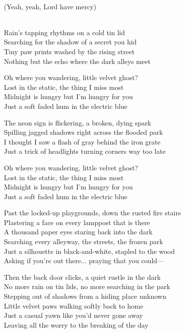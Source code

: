\begin{lyrics}
\\
(Yeah, yeah, Lord have mercy)

\\
Rain's tapping rhythms on a cold tin lid\\
Searching for the shadow of a secret you hid\\
Tiny paw prints washed by the rising street\\
Nothing but the echo where the dark alleys meet

Oh where you wandering, little velvet ghost?\\
Lost in the static, the thing I miss most\\
Midnight is hungry but I'm hungry for you\\
Just a soft faded hum  in the electric blue

The neon sign is flickering, a broken, dying spark\\
Spilling jagged shadows right across the flooded park\\
I thought I saw a flash of gray behind the iron grate\\
Just a trick of headlights turning corners way too late

Oh where you wandering, little velvet ghost?\\
Lost in the static, the thing I miss most\\
Midnight is hungry but I'm hungry for you\\
Just a soft faded hum  in the electric blue

Past the locked-up playgrounds, down the rusted fire stairs\\
Plastering a face on every lamppost that is there\\
A thousand paper eyes staring back into the dark\\
Searching every alleyway, the streets, the frozen park\\
Just a silhouette in black-and-white, stapled to the wood\\
Asking if you're out there... %
praying that you could—

Then the back door clicks, a quiet rustle in the dark\\
No more rain on tin lids, no more searching in the park\\
Stepping out of shadows from a hiding place unknown\\
Little velvet paws walking softly back to home\\
Just a casual yawn like you'd never gone away\\
Leaving all the worry to the breaking of the day
\end{lyrics}


